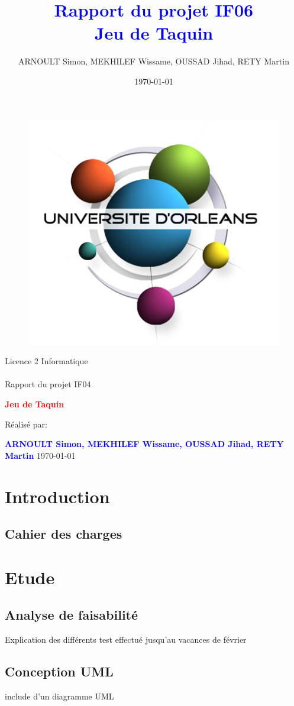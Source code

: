 \documentclass[a4paper,twoside,12pt]{report}
\title{\textcolor{blue}{\Large Rapport du projet IF06}\\\textcolor{blue}{\Large Jeu de Taquin}}
\author{ARNOULT Simon, MEKHILEF Wissame, OUSSAD Jihad, RETY Martin \date{\today}}
\begin{document}
\thispagestyle{empty}
%
\begin{figure}[H]
\includegraphics[width=0.2\linewidth]{Logo-univ-orleans.png}

\end{figure}
\vspace{2cm}
%
\begin{center}
{\Huge Licence 2 Informatique\\\ \\Rapport du projet IF04}
\par\vspace{1.4cm}

{\Huge\bf \textcolor{red}{\bf Jeu de Taquin}}
\par\vspace{1.6cm}

{\Large       Réalisé par:}
\par\vspace{1.3cm}
{\large\bf \textcolor{blue}{ARNOULT Simon, MEKHILEF Wissame, OUSSAD Jihad, RETY Martin}}
\vfill
\today
\end{center}
\newpage
\pagestyle{fancy}

\begin{abstract}
%
\end{abstract}
 
\newpage
\tableofcontents
\listoffigures
\newpage

\chapter{Introduction}
% 
\section{Cahier des charges}
%
\chapter{Etude}
%
\section{Analyse de faisabilité}
Explication des différents test effectué jusqu'au vacances de février 
\section{Conception UML}
include d'un diagramme UML 
\end{document}
